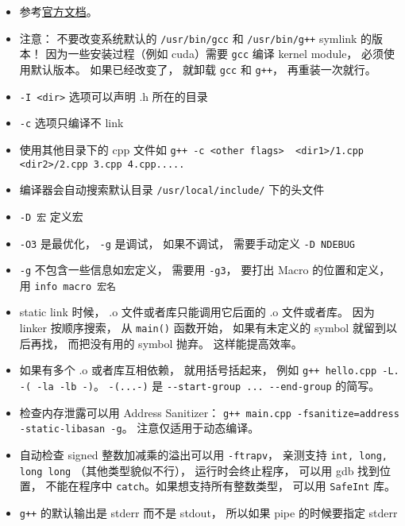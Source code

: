 
\begin{issues}
\issueDraft
\end{issues}


\begin{itemize}
\item 参考\href{https://gcc.gnu.org/onlinedocs/gcc-12.2.0/gcc/}{官方文档}。
\item 注意： 不要改变系统默认的 \verb`/usr/bin/gcc` 和 \verb`/usr/bin/g++` symlink 的版本！ 因为一些安装过程（例如 cuda）需要 \verb`gcc` 编译 kernel module， 必须使用默认版本。 如果已经改变了， 就卸载 \verb`gcc` 和 \verb`g++`， 再重装一次就行。
\item \verb`-I <dir>` 选项可以声明 .h 所在的目录
\item \verb`-c` 选项只编译不 link
\item 使用其他目录下的 cpp 文件如 \verb`g++ -c <other flags>  <dir1>/1.cpp <dir2>/2.cpp 3.cpp 4.cpp.....`
\item 编译器会自动搜索默认目录 \verb`/usr/local/include/` 下的头文件
\item \verb`-D 宏` 定义宏
\item \verb`-O3` 是最优化， \verb`-g` 是调试， 如果不调试， 需要手动定义 \verb`-D NDEBUG`
\item \verb`-g` 不包含一些信息如宏定义， 需要用 \verb`-g3`， 要打出 Macro 的位置和定义， 用 \verb`info macro 宏名`
\item static link 时候， .o 文件或者库只能调用它后面的 .o 文件或者库。 因为 linker 按顺序搜索， 从 \verb`main()` 函数开始， 如果有未定义的 symbol 就留到以后再找， 而把没有用的 symbol 抛弃。 这样能提高效率。
\item 如果有多个 .o 或者库互相依赖， 就用括号括起来， 例如 \verb`g++ hello.cpp -L. -( -la -lb -)`。 \verb`-(...-)` 是 \verb`--start-group ... --end-group` 的简写。
\item 检查内存泄露可以用 Address Sanitizer： \verb`g++ main.cpp -fsanitize=address -static-libasan -g`。 注意仅适用于动态编译。
\item 自动检查 signed 整数加减乘的溢出可以用 \verb`-ftrapv`， 亲测支持 \verb`int, long, long long` （其他类型貌似不行）， 运行时会终止程序， 可以用 gdb 找到位置， 不能在程序中 \verb`catch`。如果想支持所有整数类型， 可以用 \verb`SafeInt` 库。
\item \verb`g++` 的默认输出是 stderr 而不是 stdout， 所以如果 pipe 的时候要指定 stderr
\end{itemize}

